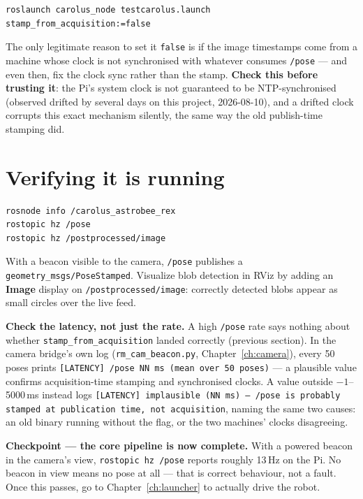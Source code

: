 \documentclass[11pt]{report}
\newenvironment{warningbox}%
  {\begin{lrbox}{\warnbox}\begin{minipage}{0.90\textwidth}}%
  {\end{minipage}\end{lrbox}%
   \begin{center}\fcolorbox{black}{codebg}{\usebox{\warnbox}}\end{center}}
\begin{document}
\begin{lstlisting}[style=shell]
roslaunch carolus_node testcarolus.launch stamp_from_acquisition:=false
\end{lstlisting}

The only legitimate reason to set it \texttt{false} is if the image
timestamps come from a machine whose clock is not synchronised with
whatever consumes \texttt{/pose} --- and even then, fix the clock sync
rather than the stamp. \textbf{Check this before trusting it}: the Pi's
system clock is not guaranteed to be NTP-synchronised (observed drifted by
several days on this project, 2026-08-10), and a drifted clock corrupts
this exact mechanism silently, the same way the old publish-time stamping
did.

\section{Verifying it is running}

\begin{lstlisting}[style=shell]
rosnode info /carolus_astrobee_rex
rostopic hz /pose
rostopic hz /postprocessed/image
\end{lstlisting}

With a beacon visible to the camera, \texttt{/pose} publishes a
\texttt{geometry\_msgs/PoseStamped}. Visualize blob detection in RViz by
adding an \textbf{Image} display on \texttt{/postprocessed/image}: correctly
detected blobs appear as small circles over the live feed.

\textbf{Check the latency, not just the rate.} A high \texttt{/pose} rate
says nothing about whether \texttt{stamp\_from\_acquisition} landed
correctly (previous section). In the camera bridge's own log
(\texttt{rm\_cam\_beacon.py}, Chapter~\ref{ch:camera}), every 50 poses
prints \texttt{[LATENCY] /pose NN ms (mean over 50 poses)} --- a plausible
value confirms acquisition-time stamping and synchronised clocks. A value
outside $-1$--5000\,ms instead logs
\texttt{[LATENCY] implausible (NN ms) --- /pose is probably stamped at
publication time, not acquisition}, naming the same two causes: an old
binary running without the flag, or the two machines' clocks disagreeing.

\begin{warningbox}
\textbf{Checkpoint --- the core pipeline is now complete.} With a powered
beacon in the camera's view, \texttt{rostopic hz /pose} reports roughly
13\,Hz on the Pi. No beacon in view means no pose at all --- that is correct
behaviour, not a fault. Once this passes, go to Chapter~\ref{ch:launcher} to
actually drive the robot.
\end{warningbox}
\end{document}
